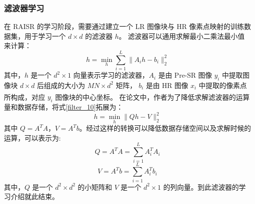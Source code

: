 \documentclass[12pt, a4paper, oneside]{ctexbook}
\begin{document}
	\subsubsection{滤波器学习}
	在 RAISR 的学习阶段，需要通过建立一个 LR 图像块与 HR 像素点映射的训练数据集，用于学习一个 $d\times d$ 的滤波器 $h$。
	滤波器可以通用求解最小二乘法最小值来计算：
	\begin{equation}
		h=\min_h\sum_{i=1}^L\lVert{A_ih-b_i}\rVert_2^2 \label{filter_10}
	\end{equation} 
	其中，$h$ 是一个 $d^2 \times 1$ 向量表示学习的滤波器，$A_i$ 是由 Pre-SR 图像 $y_i$ 中提取图像块 $d\times d$ 后组成的大小为 $MN\times d^2$ 矩阵，
	$b_i$ 是由 HR 图像 $x_i$ 中提取的像素点所构成，对应 $y_i$ 图像块的中心坐标。
	在论文\textsuperscript{\cite{1}}中，作者为了降低求解滤波器的运算量和数据存储，将式\ref{filter_10}拓展为：
	\begin{equation}
		h=\min_h\lVert Qh-V\rVert_2^2		\label{filter_11}
	\end{equation}
	其中 $Q=A^TA$，$V=A^Tb$。经过这样的转换可以降低数据存储空间以及求解时候的运算，可以表示为:
	\begin{equation}
		Q=A^TA=\sum_{i=1}^LA_i^TA_i
	\end{equation}
	\begin{equation}
		V=A^Tb=\sum_{i=1}^LA_i^Tb_i
	\end{equation}
	其中，$Q$ 是一个 $d^2 \times d^2$ 的小矩阵和 $V$ 是一个 $d^2 \times 1$ 的列向量。到此滤波器的学习介绍就此结束。
	
\end{document}
